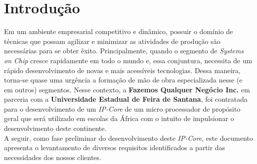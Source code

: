 \section{Introdução}

Em um ambiente empresarial competitivo e dinâmico, possuir o domínio de técnicas que possam agilizar e minimizar as atividades de produção são necessárias para se obter êxito. Principalmente, quando o segmento de \textit{Systems on Chip} cresce rapidamente em todo o mundo e, essa conjuntura, necessita de um rápido desenvolvimento de novas e mais acessíveis tecnologias. Dessa maneira, torna-se quase uma urgência a formação de mão de obra especializada nesse (e em outros) segmentos. Nesse contexto, a \textbf{Fazemos Qualquer Negócio Inc.} em parceria com a \textbf{Universidade Estadual de Feira de Santana}, foi contratada para o desenvolvimento de um \textit{IP-Core} de um micro processador de propósito geral que será utilizado em escolas da África com o intuito de impulsionar o desenvolvimento deste continente. \\
A seguir, como fase preliminar do desenvolvimento deste \textit{IP-Core}, este documento apresenta o levantamento de diversos requisitos identificados a partir das necessidades dos nossos clientes.
